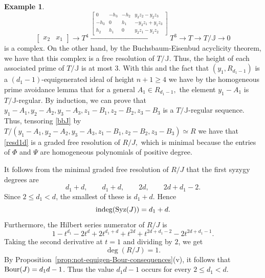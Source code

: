 \documentclass[11pt]{amsart} %
\theoremstyle{definition}
\newtheorem{Example}[Theorem]{Example}
\def\syz{\mbox{\rm Syz}}
\begin{document}
\begin{Example}
\begin{equation}
{\begin{bmatrix}
	 		x_2&x_1
	 \end{bmatrix}}{\longrightarrow} T^4\stackrel{\begin{bmatrix}
	 0&-h_3&-h_2&y_3z_2-y_2z_3\\
	 -h_3&0&h_1&-y_3z_1+y_1z_3\\
	 h_2&h_1&0&y_2z_1-y_1z_2
 \end{bmatrix}}{\longrightarrow} T^3\to T\to T/\mathbb{J}\to 0
\end{equation}
is a complex.  On the other hand, by the Buchsbaum-Eisenbud acyclicity theorem,  we have that this complex is a free resolution of $T/\mathbb{J}.$ Thus, the height of each associated prime of $T/\mathbb{J}$ is at most $3.$ With this and the fact that $(y_1,R_{d_1-1})$ is a $(d_1-1)$-equigenerated ideal of height $n+1\geq 4$ we have by the homogeneous prime avoidance lemma that for a general $A_1\in R_{d_1-1},$ the element $y_1-A_1$ is $T/\mathbb{J}$-regular. By induction, we can prove that $y_1-A_1,y_2-A_2,y_3-A_3,z_1-B_1,z_2-B_2,z_3-B_3$ is a $T/\mathbb{J}$-regular sequence. Thus,  tensoring \eqref{bbJ} by $T/(y_1-A_1,y_2-A_2,y_3-A_3,z_1-B_1,z_2-B_2,z_3-B_3)\simeq R$ we have that \eqref{resd1d} is a graded free resolution of $R/J,$ which is minimal because the entries of $\Phi$ and $\Psi$ are homogeneous polynomials of positive degree.

It follows from the minimal graded  free resolution of $R/J$ that the first syzygy degrees are
\[
d_1+d,\qquad d_1+d,\qquad 2d,\qquad 2d+d_1-2.
\]
Since \(2\le d_1<d\), the smallest of these is \(d_1+d\). Hence
\[
{\rm indeg}(\syz(J))=d_1+d.
\]
Furthermore, the Hilbert series numerator of \(R/J\) is
\[
1-t^{d_1}-2t^d+2t^{d_1+d}+t^{2d}+t^{2d+d_1-2}-2t^{2d+d_1-1}.
\]
Taking the second derivative at \(t=1\) and dividing by \(2\), we get
\[
\deg(R/J)=1.
\]
By Proposition~\ref{prop:not-equigen-Bour-consequences}{\rm(v)}, it follows
that ${\rm Bour}(J)=d_1d-1$. Thus the value $d_1d-1$ occurs for every $2\le d_1<d$.
		\end{Example}
		
\end{document}
